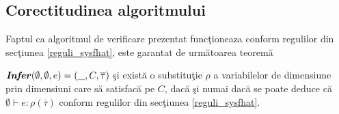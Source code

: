 \subsection{Corectitudinea algoritmului}
Faptul ca algoritmul de verificare prezentat func\c tioneaza conform regulilor din sec\c tiunea \ref{reguli_sysfhat}, este garantat de urm\u atoarea teorem\u a \citep{DBLP:conf/tlca/BartheGP05}
\done{}
\begin{theorem}
$\textbf{\emph{Infer}}(\emptyset,\emptyset,e) = (\_,C,\overline{\tau})$ \c si exist\u a o substitu\c tie $\rho$ a variabilelor de dimensiune prin dimensiuni care s\u a satisfac\u a pe $C$, dac\u a \c si numai dac\u a se poate deduce c\u a $\emptyset \vdash e : \rho(\overline{\tau})$ conform regulilor din sec\c tiunea \ref{reguli_sysfhat}.
\end{theorem}

\begin{comment}
\section{Demonstratia in \LaTeX{}}
Compilatorul poate genera un fisier \LaTeX{} care sa contina demonstratia terminarii programului conform regulilor de tip.
\todo{concret cum fac?}
\end{comment} 